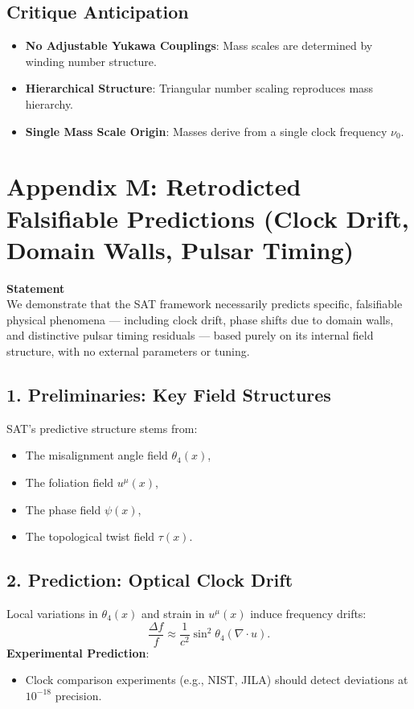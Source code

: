 \documentclass[12pt]{article}
\begin{document}
\subsection*{Critique Anticipation}
\begin{itemize}
    \item \textbf{No Adjustable Yukawa Couplings}: Mass scales are determined by winding number structure.
    \item \textbf{Hierarchical Structure}: Triangular number scaling reproduces mass hierarchy.
    \item \textbf{Single Mass Scale Origin}: Masses derive from a single clock frequency \(\nu_0\).
\end{itemize}

\newpage

\section*{Appendix M: Retrodicted Falsifiable Predictions (Clock Drift, Domain Walls, Pulsar Timing)}

\textbf{Statement} \\
We demonstrate that the SAT framework necessarily predicts specific, falsifiable physical phenomena — including clock drift, phase shifts due to domain walls, and distinctive pulsar timing residuals — based purely on its internal field structure, with no external parameters or tuning.

\subsection*{1. Preliminaries: Key Field Structures}
SAT’s predictive structure stems from:
\begin{itemize}
    \item The misalignment angle field \(\theta_4(x)\),
    \item The foliation field \(u^\mu(x)\),
    \item The phase field \(\psi(x)\),
    \item The topological twist field \(\tau(x)\).
\end{itemize}

\subsection*{2. Prediction: Optical Clock Drift}
Local variations in \(\theta_4(x)\) and strain in \(u^\mu(x)\) induce frequency drifts:
\[
\frac{\Delta f}{f} \approx \frac{1}{c^2} \sin^2 \theta_4 \left( \nabla \cdot u \right).
\]
\textbf{Experimental Prediction}:
\begin{itemize}
    \item Clock comparison experiments (e.g., NIST, JILA) should detect deviations at \(10^{-18}\) precision.
\end{itemize}
\end{document}
